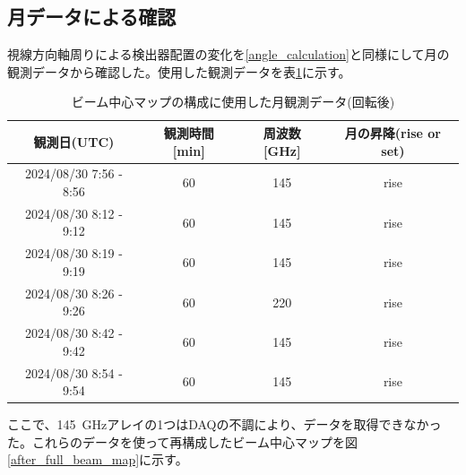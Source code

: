 \subsection{月データによる確認}
\label{moon_ana}
視線方向軸周りによる検出器配置の変化を\ref{angle_calculation}と同様にして月の観測データから確認した。使用した観測データを表\ref{after_full_array_table}に示す。
\begin{table}[htbp]
  \centering
  \caption{ビーム中心マップの構成に使用した月観測データ(回転後)}
  \vspace{3mm}
  \begin{tabular}{cccc} \hline
    観測日(UTC) & 観測時間 [min] & 周波数 [GHz] & 月の昇降(rise or set) \\ \hline
    2024/08/30 7:56 - 8:56 & 60 & 145 & rise \\
    2024/08/30 8:12 - 9:12 & 60 & 145 & rise \\
    2024/08/30 8:19 - 9:19 & 60 & 145 & rise \\
    2024/08/30 8:26 - 9:26 & 60 & 220 & rise \\
    2024/08/30 8:42 - 9:42 & 60 & 145 & rise \\
    2024/08/30 8:54 - 9:54 & 60 & 145 & rise \\ \hline

  \end{tabular}
  \label{after_full_array_table}
\end{table}
ここで、\SI{145}{GHz}アレイの1つはDAQの不調により、データを取得できなかった。これらのデータを使って再構成したビーム中心マップを図\ref{after_full_beam_map}に示す。

